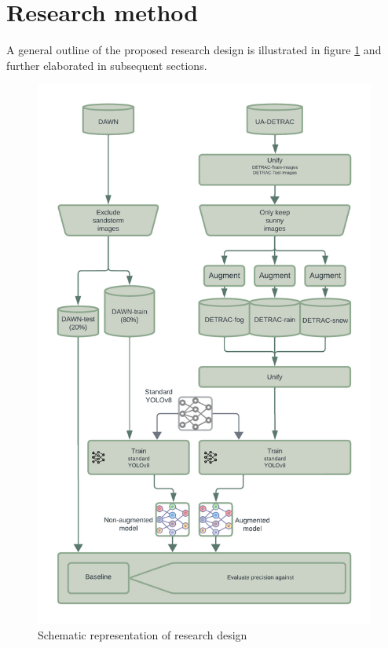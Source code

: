 \documentclass[]{article}
\begin{document}
\section{Research method}

	A general outline of the proposed research design is illustrated in figure \ref{fig:experiment_process} and further elaborated in subsequent sections.

	\begin{figure}[H]
		\centering
		\includegraphics[scale=0.21]{Proposal_diagram.png}
		\caption{Schematic representation of research design}
		\label{fig:experiment_process}
	\end{figure}
\end{document}
